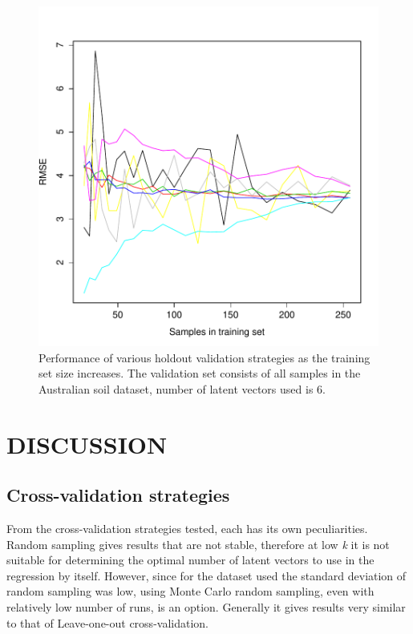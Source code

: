 \documentclass{isprs}
\begin{document}
\begin{figure}[ht!]
\includegraphics[width=1.0\columnwidth]{../script/output/rmse-au-6.pdf}
\begin{center}
    \caption{Performance of various holdout validation strategies as the training set size increases. The validation set consists of all samples in the Australian soil dataset, number of latent vectors used is 6.}
    \label{fig:rmse-nl-6}
\end{center}
\end{figure}

\section{DISCUSSION}\label{sec:DISCUSSION}

\subsection{Cross-validation strategies}\label{sec:Cross-validation strategies 3}

From the cross-validation strategies tested, each has its own peculiarities. Random sampling gives results that are not stable, therefore at low \textit{k} it is not suitable for determining the optimal number of latent vectors to use in the regression by itself. However, since for the dataset used the standard deviation of random sampling was low, using Monte Carlo random sampling, even with relatively low number of runs, is an option. Generally it gives results very similar to that of Leave-one-out cross-validation.
\end{document}
